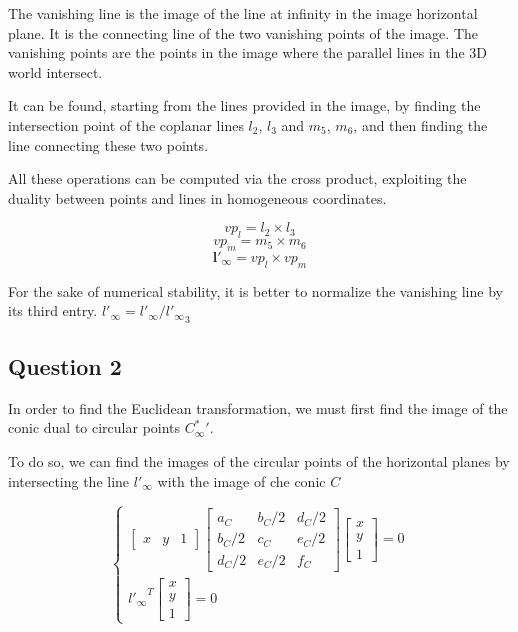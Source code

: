 \documentclass[a4paper, 11pt, oneside, openright, english]{article}
\begin{document}
The vanishing line is the image of the line at infinity in the image horizontal plane. It is the connecting line of the two vanishing points of the image. The vanishing points are the points in the image where the parallel lines in the 3D world intersect.

It can be found, starting from the lines provided in the image, by finding the intersection point of the coplanar lines $l_2$, $l_3$ and $m_5$, $m_6$, and then finding the line connecting these two points.

All these operations can be computed via the cross product, exploiting the duality between points and lines in homogeneous coordinates.

\begin{equation*}
    vp_l = l_2 \times l_3
\end{equation*}
\begin{equation*}
    vp_m = m_5 \times m_6
\end{equation*}
\begin{equation}
    \mathbf{l'_\infty} = vp_l \times vp_m
\end{equation}

For the sake of numerical stability, it is better to normalize the vanishing line by its third entry. $l'_\infty = l'_\infty / {l'_\infty}_3$

\subsection{Question 2}

In order to find the Euclidean transformation, we must first find the image of the conic dual to circular points ${C^{*}_\infty}'$.

To do so, we can find the images of the circular points of the horizontal planes by intersecting the line $l'_\infty$ with the image of che conic $C$

\begin{equation}
    \begin{cases}
        \begin{bmatrix}
            x & y & 1
        \end{bmatrix}
        \begin{bmatrix}
            a_C   & b_C/2 & d_C/2 \\
            b_C/2 & c_C   & e_C/2 \\
            d_C/2 & e_C/2 & f_C
        \end{bmatrix}
        \begin{bmatrix}
            x \\ y \\ 1
        \end{bmatrix}
        = 0 \\
        {l'_\infty}^T
        \begin{bmatrix}
            x \\ y \\ 1
        \end{bmatrix}
        = 0
    \end{cases}
    \label{eq:conic}
\end{equation}
\end{document}
